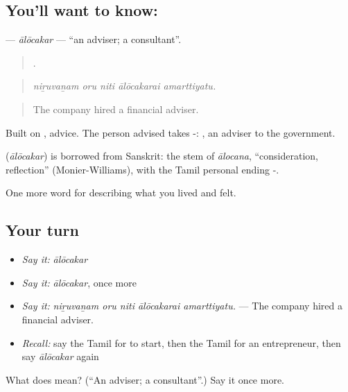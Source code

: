 \subsection*{You'll want to know: }
\textbf{} — \emph{ālōcakar} — \textquotedblleft{}an adviser; a consultant\textquotedblright{}.

\begin{quote}
    .
\end{quote}

\begin{quote}
\emph{niṟuvaṉam oru niti ālōcakarai amarttiyatu.}
\end{quote}

\begin{quote}
The company hired a financial adviser.
\end{quote}

Built on , advice. The person advised takes -:  , an adviser to the government.

\begin{cousinweb}
\textbf{} (\emph{ālōcakar}) is borrowed from Sanskrit: the stem of \emph{ālocana}, \textquotedblleft{}consideration, reflection\textquotedblright{} (Monier-Williams), with the Tamil personal ending -.
\end{cousinweb}

\begin{grammarlens}[title={What you've built}]
One more word for describing what you lived and felt.
\end{grammarlens}

\subsection*{Your turn}
\begin{itemize}
\raggedright
  \item \emph{Say it:} \emph{ālōcakar}
  \item \emph{Say it:} \emph{ālōcakar}, once more
  \item \emph{Say it:} \emph{niṟuvaṉam oru niti ālōcakarai amarttiyatu.} — The company hired a financial adviser.
  \item \emph{Recall:} say the Tamil for to start, then the Tamil for an entrepreneur, then say \emph{ālōcakar} again
\end{itemize}

\begin{tcolorbox}[breakable,colback=teal!4,colframe=teal!35!black,title={Before you move on}]
What does  mean? (\textquotedblleft{}An adviser; a consultant\textquotedblright{}.) Say it once more.
\end{tcolorbox}
